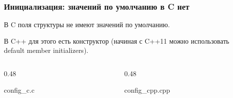 \documentclass[compress, 8pt, aspectratio=169]{beamer}
\begin{document}
\begin{frame}[fragile]

    \frametitle{Инициализация: значений по умолчанию в C нет}

    \begin{myitemize}

        \item В C поля структуры не имеют значений по умолчанию.

        \item В C++ для этого есть конструктор (начиная с C++11
            можно использовать default member initializers).

    \end{myitemize}

    \begin{columns}[T]

        \begin{column}{0.48\textwidth}

                {config_c.c}

        \end{column}

        \begin{column}{0.48\textwidth}

                {config_cpp.cpp}

        \end{column}

    \end{columns}

\end{frame}
\end{document}
